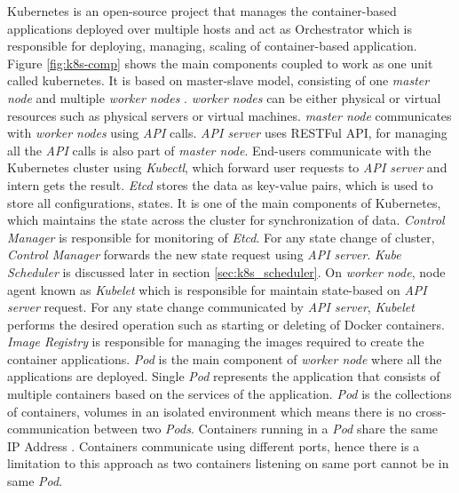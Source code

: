 Kubernetes is an open-source project that manages the container-based applications deployed over multiple hosts and act as Orchestrator which is responsible for deploying, managing, scaling of container-based application\cite{k8s-git}. Figure \ref{fig:k8s-comp} shows the main components coupled to work as one unit called kubernetes. It is based on master-slave model, consisting of one \emph{master node} and multiple \emph{worker nodes} \cite{Santos2019}. \emph{worker nodes} can be either physical or virtual resources such as physical servers or virtual machines. \emph{master node} communicates with \emph{worker nodes} using \emph{API} calls\cite{Santos2019}. \emph{API server} uses RESTFul API, for managing all the \emph{API} calls is also part of \emph{master node}. End-users communicate with the Kubernetes cluster using \emph{Kubectl}, which forward user requests to \emph{API server} and intern gets the result. \emph{Etcd} stores the data as key-value pairs, which is used to store all configurations, states. It is one of the main components of Kubernetes, which maintains the state across the cluster for synchronization of data\cite{Santos2019}. \emph{Control Manager} is responsible for monitoring of \emph{Etcd}. For any state change of cluster, \emph{Control Manager} forwards the new state request using \emph{API server}\cite{Santos2019}. \emph{Kube Scheduler} is discussed later in section \ref{sec:k8s_scheduler}. On \emph{worker node}, node agent known as \emph{Kubelet} which is responsible for maintain state-based on \emph{API server} request\cite{Santos2019}. For any state change communicated by \emph{API server}, \emph{Kubelet} performs the desired operation such as starting or deleting of Docker containers\cite{Santos2019}. \emph{Image Registry} is responsible for managing the images required to create the container applications. \emph{Pod} is the main component of \emph{worker node} where all the applications are deployed. Single \emph{Pod} represents the application that consists of multiple containers based on the services of the application. \emph{Pod} is the collections of containers, volumes in an isolated environment which means there is no cross-communication between two \emph{Pods}\cite{Santos2019}. Containers running in a \emph{Pod} share the same IP Address \cite{Santos2019}. Containers communicate using different ports, hence there is a limitation to this approach as two containers listening on same port cannot be in same \emph{Pod}\cite{Santos2019}.
